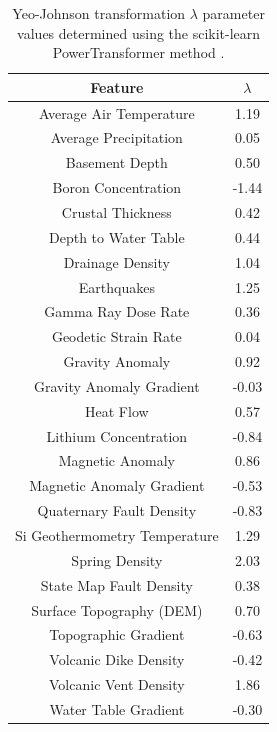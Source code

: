 \begin{table}[htp]
\centering
\begin{tabular}{|c|c|}
\hline
\textbf{Feature} & \textbf{$\lambda$} \\ \hline
Average Air Temperature & 1.19 \\ \hline
Average Precipitation & 0.05 \\ \hline
Basement Depth & 0.50 \\ \hline
Boron Concentration & -1.44 \\ \hline
Crustal Thickness & 0.42 \\ \hline
Depth to Water Table & 0.44 \\ \hline
Drainage Density & 1.04 \\ \hline
Earthquakes & 1.25 \\ \hline
Gamma Ray Dose Rate & 0.36 \\ \hline
Geodetic Strain Rate & 0.04 \\ \hline
Gravity Anomaly & 0.92 \\ \hline
Gravity Anomaly Gradient & -0.03 \\ \hline
Heat Flow & 0.57 \\ \hline
Lithium Concentration & -0.84 \\ \hline
Magnetic Anomaly & 0.86 \\ \hline
Magnetic Anomaly Gradient & -0.53 \\ \hline
Quaternary Fault Density & -0.83 \\ \hline
Si Geothermometry Temperature & 1.29 \\ \hline
Spring Density & 2.03 \\ \hline
State Map Fault Density & 0.38 \\ \hline
Surface Topography (DEM) & 0.70 \\ \hline
Topographic Gradient & -0.63 \\ \hline
Volcanic Dike Density & -0.42 \\ \hline
Volcanic Vent Density & 1.86 \\ \hline
Water Table Gradient & -0.30 \\ \hline
\end{tabular}
\caption{Yeo-Johnson transformation $\lambda$ parameter values determined using the scikit-learn PowerTransformer method \protect\citep{scikit-learn_sklearnpreprocessingpowertransformer_2021}.}
\label{tab:yeo_lambdas}
\end{table}

